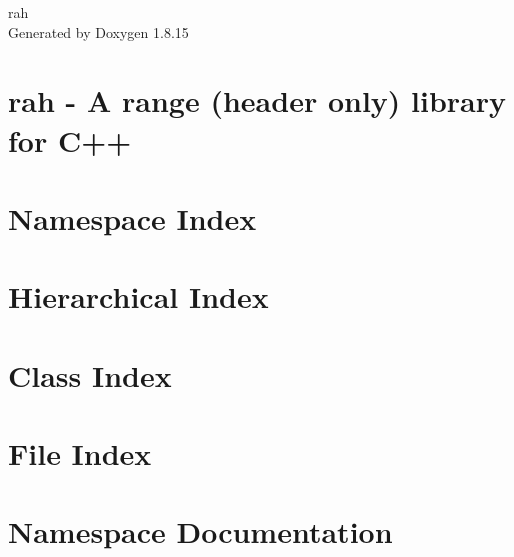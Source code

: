 \let\mypdfximage\pdfximage\def\pdfximage{\immediate\mypdfximage}\documentclass[twoside]{book}
\newcommand{\+}{\discretionary{\mbox{\scriptsize$\hookleftarrow$}}{}{}}
\newcommand{\clearemptydoublepage}{%
  \newpage{\pagestyle{empty}\cleardoublepage}%
}
\begin{document}
\hypersetup{pageanchor=false,
             bookmarksnumbered=true,
             pdfencoding=unicode
            }
\begin{titlepage}
\vspace*{7cm}
\begin{center}%
{\Large rah }\\
\vspace*{1cm}
{\large Generated by Doxygen 1.8.15}\\
\end{center}
\end{titlepage}
\clearemptydoublepage
{}
\tableofcontents
\clearemptydoublepage
{}
\hypersetup{pageanchor=true}

\chapter{rah -\/ A range (header only) library for C++}
\label{index}\hypertarget{index}{}
\chapter{Namespace Index}

\chapter{Hierarchical Index}

\chapter{Class Index}

\chapter{File Index}

\chapter{Namespace Documentation}





\end{document}
